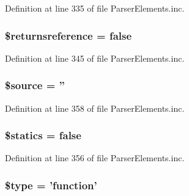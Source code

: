 \-Definition at line 335 of file \-Parser\-Elements.\-inc.

\hypertarget{classparser_function_ac008ac052b21c0b6428b9d320cd79ed4}{
\subsubsection[{\$returnsreference}]{\setlength{\rightskip}{0pt plus 5cm}\$returnsreference = false}}\label{classparser_function_ac008ac052b21c0b6428b9d320cd79ed4}


\-Definition at line 345 of file \-Parser\-Elements.\-inc.

\hypertarget{classparser_function_a99a2b085f0a29bd5d799fdcbb63d261b}{
\subsubsection[{\$source}]{\setlength{\rightskip}{0pt plus 5cm}\$source = ''}}\label{classparser_function_a99a2b085f0a29bd5d799fdcbb63d261b}


\-Definition at line 358 of file \-Parser\-Elements.\-inc.

\hypertarget{classparser_function_a6f9b86cb70b333ced9db7133842c4880}{
\subsubsection[{\$statics}]{\setlength{\rightskip}{0pt plus 5cm}\$statics = false}}\label{classparser_function_a6f9b86cb70b333ced9db7133842c4880}


\-Definition at line 356 of file \-Parser\-Elements.\-inc.

\hypertarget{classparser_function_a9a4a6fba2208984cabb3afacadf33919}{
\subsubsection[{\$type}]{\setlength{\rightskip}{0pt plus 5cm}\$type = 'function'}}\label{classparser_function_a9a4a6fba2208984cabb3afacadf33919}


